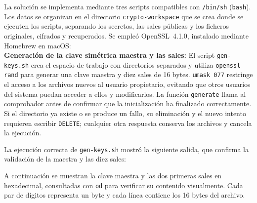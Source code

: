 La solución se implementa mediante tres scripts compatibles con \texttt{/bin/sh} (\texttt{bash}).
Los datos se organizan en el directorio \texttt{crypto-workspace} que se crea donde se ejecuten los scripts, separando los secretos, las sales públicas y los ficheros originales, cifrados y recuperados. Se empleó OpenSSL~4.1.0, instalado mediante Homebrew en macOS:\\



\textbf{Generación de la clave simétrica maestra y las sales:}
El script \texttt{gen-keys.sh} crea el espacio de trabajo con directorios separados y utiliza \texttt{openssl rand} para generar una clave maestra y diez sales de 16 bytes. 
\texttt{umask 077} restringe el acceso a los archivos nuevos al usuario propietario, evitando que otros usuarios del sistema puedan acceder a ellos y modificarlos.
La función \texttt{generate} llama al comprobador antes de confirmar que la inicialización ha finalizado correctamente.
Si el directorio ya existe o se produce un fallo, su eliminación y el nuevo intento requieren escribir \texttt{DELETE}; cualquier otra respuesta conserva los archivos y cancela la ejecución.

\begingroup
\renewcommand{\lstlistingname}{Script}

\endgroup

La ejecución correcta de \texttt{gen-keys.sh} mostró la siguiente salida, que confirma la validación de la maestra y las diez sales:

\begingroup
\renewcommand{\lstlistingname}{Salida y verificación}

\endgroup

A continuación se muestran la clave maestra y las dos primeras sales en hexadecimal, consultadas con \texttt{od} para verificar su contenido visualmente.
Cada par de dígitos representa un byte y cada línea contiene los 16 bytes del archivo.

\begingroup
{}

\endgroup

